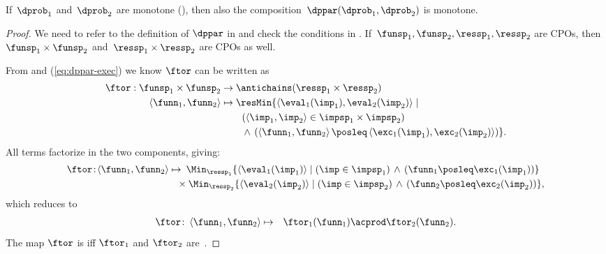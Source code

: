 \begin{proposition}
\label{pro:dppar-monotone}If~$\dprob_{1}$ and~$\dprob_{2}$ are
monotone (), then also the composition~$\dppar(\dprob_{1},\dprob_{2})$
is monotone.
\end{proposition}
\begin{proof}
We need to refer to the definition of $\dppar$ in 
and check the conditions in . If~$\funsp_{1},\funsp_{2},\ressp_{1},\ressp_{2}$
are CPOs, then~$\funsp_{1}\times\funsp_{2}$ and~$\ressp_{1}\times\ressp_{2}$
are CPOs as well.

From  and (\ref{eq:dppar-exec}) we know $\ftor$ can
be written as
\begin{align*}
\ftor:\funsp_{1}\times\funsp_{2} & \rightarrow\antichains(\ressp_{1}\times\ressp_{2})\\
\left\langle \funn_{1},\funn_{2}\right\rangle  & \mapsto\resMin\{\left\langle \eval_{1}(\imp_{1}),\eval_{2}(\imp_{2})\right\rangle \mid\\
 & \qquad\left(\left\langle \imp_{1},\imp_{2}\right\rangle \in\impsp_{1}\times\impsp_{2}\right)\\
 & \qquad\,\wedge\,\left(\left\langle \funn_{1},\funn_{2}\right\rangle \posleq\left\langle \exc_{1}(\imp_{1}),\exc_{2}(\imp_{2})\right\rangle \right)\}.
\end{align*}
All terms factorize in the two components, giving:{\small{}
\begin{align*}
\ftor\!:\!\left\langle \funn_{1},\funn_{2}\right\rangle \mapsto & \!\!\!\quad\Min_{\ressp_{1}}\{\left\langle \eval_{1}(\imp_{1})\right\rangle \mid\left(\imp\in\impsp_{1}\right)\,\wedge\,\left(\funn_{1}\posleq\exc_{1}(\imp_{1})\right)\}\\
 & \!\!\!\times\Min_{\ressp_{2}}\{\left\langle \eval_{2}(\imp_{2})\right\rangle \mid\left(\imp\in\impsp_{2}\right)\,\wedge\,\left(\funn_{2}\posleq\exc_{2}(\imp_{2})\right)\},
\end{align*}
}which reduces to
\begin{eqnarray}
\ftor\colon\left\langle \funn_{1},\funn_{2}\right\rangle  & \mapsto & \ftor_{1}(\funn_{1})\acprod\ftor_{2}(\funn_{2}).\label{eq:isproduct}
\end{eqnarray}
The map $\ftor$ is \scottcontinuous iff $\ftor_{1}$ and $\ftor_{2}$
are~\cite[Lemma II.2.8]{gierz03continuous}.
\end{proof}

